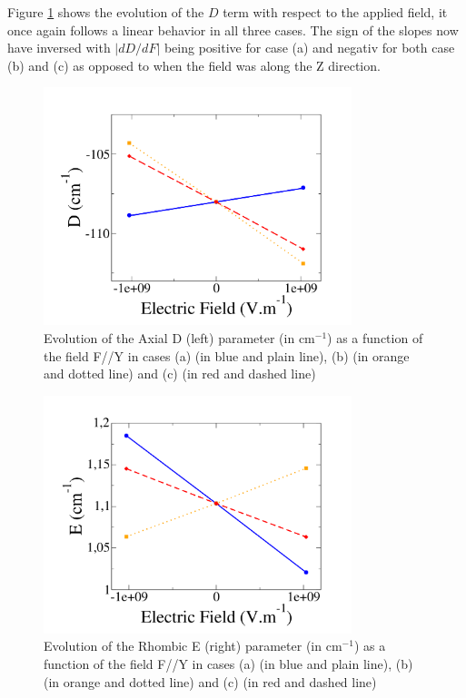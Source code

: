 \documentclass[10pt]{report}
\numberwithin{equation}{section}
\begin{document}
Figure \ref{fig:Ni_D_Y} shows the evolution of the $D$ term with respect to the applied field, it once again follows a linear behavior in all three cases.
The sign of the slopes now have inversed with $|dD/dF|$ being positive for case (a) and negativ for both case (b) and (c) as opposed to when the field was along the Z direction.


\begin{figure}[!h]
    \centering
    \includegraphics[width=0.8\textwidth]{Images/D_E_Y.png}
    \caption{Evolution of the Axial D (left) parameter (in cm$^{-1}$) as a function of the field F//Y in cases (a) (in blue and plain line), (b) (in orange and dotted line) and (c) (in red and dashed line)}
    \label{fig:Ni_D_Y}
\end{figure}

\begin{figure}[!h]
    \centering
    \includegraphics[width=0.8\textwidth]{Images/E_E_Y.png}
    \caption{Evolution of the Rhombic E (right) parameter (in cm$^{-1}$) as a function of the field F//Y in cases (a) (in blue and plain line), (b) (in orange and dotted line) and (c) (in red and dashed line)}
    \label{fig:Ni_E_Y}
\end{figure}
\end{document}
